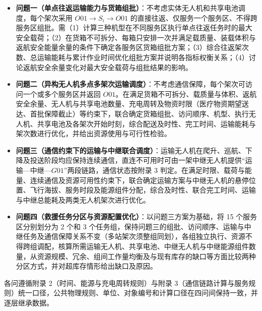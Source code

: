 \begin{itemize}[leftmargin=2em]
  \item \textbf{问题一（单点往返运输能力与货箱组批）}：不考虑实体无人机和共享电池调度，每个架次采用 $O01\to S_i\to O01$ 的直接往返、仅服务一个服务区、不得跨服务区组批。需（1）计算三种机型在不同服务区执行单点往返任务时的最大安全载荷；（2）在货箱不可拆分、每箱只安排一次并满足载质量、装载体积与返航安全能量余量的条件下确定各服务区货箱组批方案；（3）综合往返架次数、总运输能耗与累计作业时间优化组批方案并说明各指标权衡关系；（4）讨论返航安全余量变化对最大安全载荷与组批结果的影响。
  \item \textbf{问题二（异构无人机多点多架次运输调度）}：不考虑通信保障，每个架次可访问一个或多个服务区并返回 $O01$。在满足货箱不可拆分、载质量与体积、返航安全余量、无人机与共享电池数量、充电周转及物资时限（医疗物资期望送达、首批保障截止）等约束下，联合确定货箱组批、访问顺序、机型、执行无人机、共享电池及各架次开始时刻，综合配送及时性、完工时间、运输能耗与架次数进行优化，并给出资源使用与可行性检验。
  \item \textbf{问题三（通信约束下的运输与中继联合调度）}：运输无人机在爬升、巡航、下降及投送阶段均应保持连续通信，直连不可用时可由一架中继无人机提供“运输—中继—$G01$”两段链路，通信状态按附录 3 判定。在满足时限、载荷与能量、连续通信及资源可用性约束下，联合确定运输方案与中继无人机的悬停位置、飞行海拔、服务时段及能源组件分配，综合及时性、联合完工时间、运输与中继总能耗及两类无人机架次进行优化。
  \item \textbf{问题四（救援任务分区与资源配置优化）}：以问题三方案为基础，将 15 个服务区分别划分为 2 个和 3 个任务组，保持问题三的组批、访问顺序、运输与中继任务及通信保障关系不变（多站架次须整组同划），各组独立执行、资源不得跨组调配，核算所需运输无人机、共享电池、中继无人机与中继能源组件数量，从资源规模、冗余、组间工作量均衡及与现有库存的缺口等方面比较两种分区方式，并对超库存情形给出缺口及原因。
\end{itemize}

各问遵循附录 2（时间、能源与充电周转规则）与附录 3（通信链路计算与服务规则）统一口径，公共物理规则、单位、对象编号和计算口径在四问间保持一致，并逐层继承数据。
